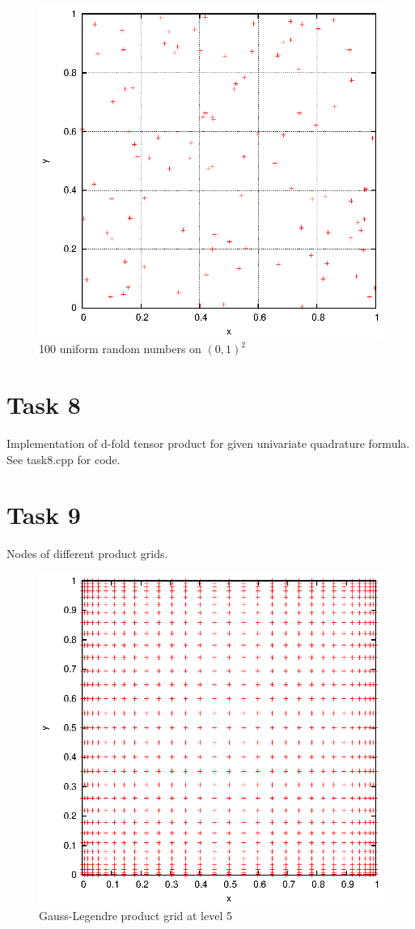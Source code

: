 \documentclass[]{article}
\begin{document}
\begin{figure}[!ht]
\centering
\includegraphics[width=.9\textwidth]{task7_uniform.eps}
\caption{100 uniform random numbers on $(0,1)^2$}
\label{fig:Task7b}
\end{figure}
\clearpage




\section*{Task 8}
Implementation of d-fold tensor product for given univariate quadrature formula. See task8.cpp for code.

\section*{Task 9}
Nodes of different product grids.\\
\begin{figure}[!ht]
\centering
\includegraphics[width=.9\textwidth]{task9_gauss}
\caption{Gauss-Legendre product grid at level 5}
\label{fig:Task9a}
\end{figure}
\end{document}

